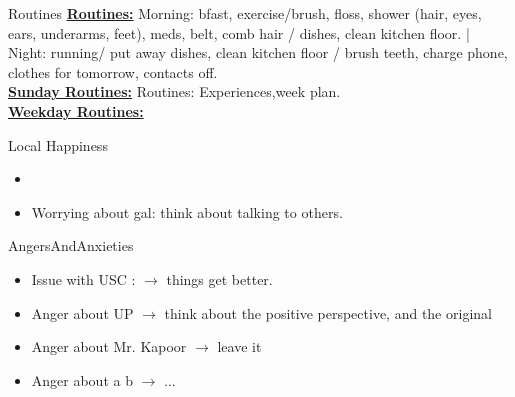 \begin{columns}
  \begin{column}{0.20\linewidth}
    \begin{block}{Routines}
      { \tiny \underline{\bf Routines:} Morning: bfast, exercise/brush,
        floss, shower (hair, eyes, ears, underarms, feet), meds, belt,
        comb hair / dishes, clean kitchen floor. |  Night: running/ put
        away dishes, clean kitchen floor / brush teeth, charge phone,
        clothes for tomorrow, contacts off.}\\
      {\tiny \underline{\bf Sunday Routines:} Routines:
        Experiences,week plan.}\\ 
      {\tiny \underline{\bf Weekday Routines:}}\\
    \end{block} 
    \begin{block}{Local Happiness}
      \begin{itemize} 
        \tiny \item \tiny
      \item \tiny Worrying about gal: think about talking to others.
      \end{itemize} 
    \end{block}
    \begin{block}{AngersAndAnxieties}
      \begin{itemize}
        \item \tiny Issue with USC : $\rightarrow$ things get better. 
        \tiny \item \tiny Anger about UP $\rightarrow$ think about the positive
        perspective, and the original
      \item \tiny Anger about Mr. Kapoor $\rightarrow$  leave it
      \item \tiny Anger about a b  $\rightarrow$ ...


\end{itemize}
\end{block}
\end{column}
\end{columns}
